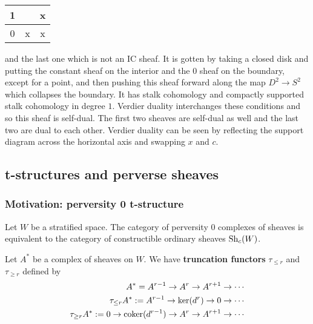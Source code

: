 \begin{example}
\begin{center}
\begin{tabular}{|c|c|c|}
            \hline
            1 &  &  x\\
            \hline
            0 & x & x\\
            \hline
        \end{tabular}
    \end{center}
    and the last one which is not an IC sheaf. It is gotten by taking a closed disk and putting the constant sheaf on the interior
    and the 0 sheaf on the boundary, except for a point, and then pushing 
    this sheaf forward along the map $D^2\to S^2$ which collapses the boundary. It has
    stalk cohomology and compactly supported stalk cohomology in degree $1$. Verdier duality
    interchanges these conditions and so this sheaf is self-dual. The first two sheaves
    are self-dual as well and the last two are dual to each other. Verdier duality can be seen
    by reflecting the support diagram across the horizontal axis and swapping $x$ and $c$.
\end{example}

\subsection{t-structures and perverse sheaves}
\subsubsection{Motivation: perversity 0 t-structure}
Let $W$ be a stratified space. The category of perversity 0 complexes 
of sheaves is equivalent to the category of 
constructible ordinary sheaves $\operatorname{Sh}_c(W)$. 

\begin{definition}
    Let $A^*$ be a complex of sheaves on $W$. 
    We have \textbf{truncation functors} $\tau_{\leq r} $ and $ \tau_{\geq r}$ defined by
    \begin{align*}
        A^* = A^{r-1} \to A^r \to A^{r+1} \to \cdots\\
        \tau_{\leq r}A^* := A^{r-1} \to \ker(d^r) \to 0 \to \cdots\\
        \tau_{\geq r}A^* := 0 \to \operatorname{coker}(d^{r-1}) \to A^r \to A^{r+1} \to \cdots
    \end{align*}
\end{definition}

